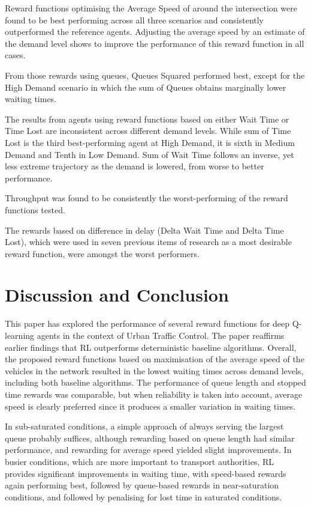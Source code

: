 \documentclass{article}
\begin{document}
Reward functions optimising the Average Speed of around the intersection were found to be best performing across all three scenarios and consistently outperformed the reference agents.
Adjusting the average speed by an estimate of the demand level shows to improve the performance of this reward function in all cases.

From those rewards using queues, Queues Squared performed best, except for the High Demand scenario in which the sum of Queues obtains marginally lower waiting times.

The results from agents using reward functions based on either Wait Time or Time Lost are inconsistent across different demand levels.
While sum of Time Lost is the third best-performing agent at High Demand, it is sixth in Medium Demand and Tenth in Low Demand.
Sum of Wait Time follows an inverse, yet less extreme trajectory as the demand is lowered, from worse to better performance.

Throughput was found to be consistently the worst-performing of the reward functions tested.

The rewards based on difference in delay (Delta Wait Time and Delta Time Lost), which were used in seven previous items of research as a most desirable reward function, were amongst the worst performers.


\section{Discussion and Conclusion}
This paper has explored the performance of several reward functions for deep Q-learning agents in the context of Urban Traffic Control. The paper reaffirms earlier findings that RL outperforms deterministic baseline algorithms.
Overall, the proposed reward functions based on maximisation of the average speed of the vehicles in the network resulted in the lowest waiting times across demand levels, including both baseline algorithms.
The performance of queue length and stopped time rewards was comparable, but when reliability is taken into account, average speed is clearly preferred since it produces a smaller variation in waiting times.

In sub-saturated conditions, a simple approach of always serving the largest queue probably suffices, although rewarding based on queue length had similar performance, and rewarding for average speed yielded slight improvements.
In busier conditions, which are more important to transport authorities, RL provides significant improvements in waiting time, with speed-based rewards again performing best, followed by queue-based rewards in near-saturation conditions, and followed by penalising for lost time in saturated conditions.
\end{document}
